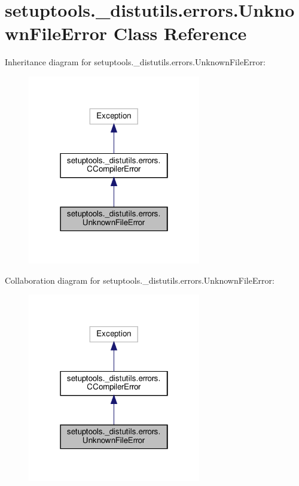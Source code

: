 \hypertarget{classsetuptools_1_1__distutils_1_1errors_1_1UnknownFileError}{}\section{setuptools.\+\_\+distutils.\+errors.\+Unknown\+File\+Error Class Reference}
\label{classsetuptools_1_1__distutils_1_1errors_1_1UnknownFileError}


Inheritance diagram for setuptools.\+\_\+distutils.\+errors.\+Unknown\+File\+Error\+:
\nopagebreak
\begin{figure}[H]
\begin{center}
\leavevmode
\includegraphics[width=214pt]{classsetuptools_1_1__distutils_1_1errors_1_1UnknownFileError__inherit__graph}
\end{center}
\end{figure}


Collaboration diagram for setuptools.\+\_\+distutils.\+errors.\+Unknown\+File\+Error\+:
\nopagebreak
\begin{figure}[H]
\begin{center}
\leavevmode
\includegraphics[width=214pt]{classsetuptools_1_1__distutils_1_1errors_1_1UnknownFileError__coll__graph}
\end{center}
\end{figure}


